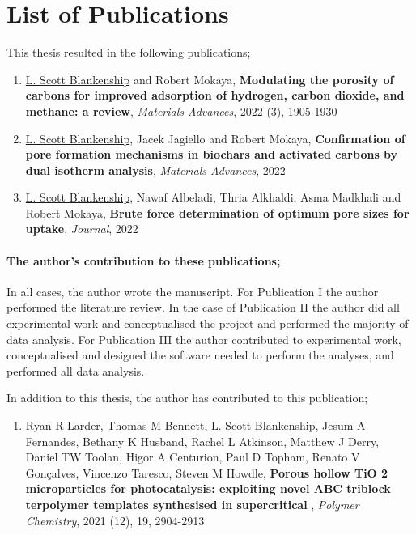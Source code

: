 
\chapter*{List of Publications}

This thesis resulted in the following publications;

\begin{enumerate}[label=\Roman*]
    \item \underline{L. Scott Blankenship} and Robert Mokaya, \textbf{Modulating the porosity of carbons for improved adsorption of hydrogen, carbon dioxide, and methane: a review}, \textit{Materials Advances}, 2022 (3), 1905-1930
    \item \underline{L. Scott Blankenship}, Jacek Jagiello and Robert Mokaya, \textbf{Confirmation of pore formation mechanisms in biochars and activated carbons by dual isotherm analysis}, \textit{Materials Advances}, 2022
    \item \underline{L. Scott Blankenship}, Nawaf Albeladi, Thria Alkhaldi, Asma Madkhali and Robert Mokaya, \textbf{Brute force determination of optimum pore sizes for  uptake}, \textit{Journal}, 2022
    
\end{enumerate}

\subsubsection*{The author's contribution to these publications;}

In all cases, the author wrote the manuscript. For Publication I the author performed the literature review. In the case of Publication II the author did all experimental work and conceptualised the project and performed the majority of data analysis. For Publication III the author contributed to experimental work, conceptualised and designed the software needed to perform the analyses, and performed all data analysis.

In addition to this thesis, the author has contributed to this publication;

\begin{enumerate}[resume, label=\Roman*]
    \item Ryan R Larder, Thomas M Bennett, \underline{L. Scott Blankenship}, Jesum A Fernandes, Bethany K Husband, Rachel L Atkinson, Matthew J Derry, Daniel TW Toolan, Higor A Centurion, Paul D Topham, Renato V Gonçalves, Vincenzo Taresco, Steven M Howdle, \textbf{Porous hollow TiO 2 microparticles for photocatalysis: exploiting novel ABC triblock terpolymer templates synthesised in supercritical }, \textit{Polymer Chemistry}, 2021 (12), 19, 2904-2913
    
\end{enumerate}


